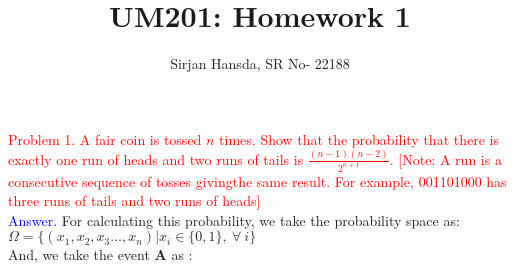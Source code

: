 \documentclass{article}
\title{UM201: Homework 1}
\author{Sirjan Hansda, SR No- 22188}
\begin{document}
\maketitle


\textcolor{red}{Problem 1. A fair coin is tossed $n$ times. Show that the probability that there is exactly one run of heads and two runs of tails is $\frac{(n-1)(n-2)}{2^{n+1}}$.  [Note: A run is a consecutive sequence of tosses givingthe same result. For example, 001101000 has three runs of tails and two runs of heads]} \\


\textcolor{blue}{Answer.} For calculating this probability, we take the probability space as: \\

$\Omega=\{(x_1,x_2,x_3 \dots , x_n) | x_i \in \{0,1\}, \: \forall \: i\}$ \\

And, we take the event \textbf A as : \\
\end{document}
